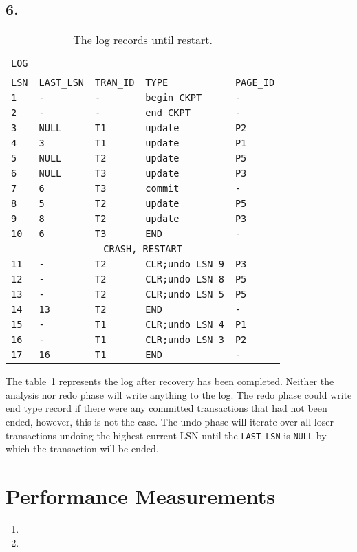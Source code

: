 \documentclass[a4paper]{article}
\begin{document}
\subsection*{6.}
\begin{table}[h!]
\begin{tabular*}{\textwidth}{@{\extracolsep{\fill}}lllll}
\texttt{LOG}&&&& \\
&&&&\\
\texttt{LSN} & \texttt{LAST\_LSN} & \texttt{TRAN\_ID} & \texttt{TYPE} & \texttt{PAGE\_ID} \\
\texttt{1} & \texttt{-} & \texttt{-} & \texttt{begin CKPT} & \texttt{-} \\
\texttt{2} & \texttt{-} & \texttt{-} & \texttt{end CKPT} & \texttt{-} \\
\texttt{3} & \texttt{NULL} & \texttt{T1} & \texttt{update} & \texttt{P2} \\
\texttt{4} & \texttt{3} &\texttt{T1} & \texttt{update} & \texttt{P1} \\
\texttt{5} & \texttt{NULL} & \texttt{T2} & \texttt{update} & \texttt{P5} \\
\texttt{6} & \texttt{NULL} & \texttt{T3} & \texttt{update} & \texttt{P3} \\
\texttt{7} & \texttt{6} & \texttt{T3} & \texttt{commit} & \texttt{-} \\
\texttt{8} & \texttt{5} & \texttt{T2} & \texttt{update} & \texttt{P5} \\
\texttt{9} & \texttt{8} & \texttt{T2} & \texttt{update} & \texttt{P3} \\
\texttt{10} & \texttt{6} & \texttt{T3} & \texttt{END} & \texttt{-} \\
\multicolumn{5}{c}{\texttt{CRASH, RESTART}}\\
\texttt{11} & \texttt{-} & \texttt{T2} & \texttt{CLR;undo LSN 9} & \texttt{P3} \\
\texttt{12} & \texttt{-} & \texttt{T2} & \texttt{CLR;undo LSN 8} & \texttt{P5} \\
\texttt{13} & \texttt{-} & \texttt{T2} & \texttt{CLR;undo LSN 5} & \texttt{P5} \\
\texttt{14} & \texttt{13} &\texttt{T2} & \texttt{END} & \texttt{-} \\
\texttt{15} & \texttt{-} & \texttt{T1} & \texttt{CLR;undo LSN 4} & \texttt{P1} \\
\texttt{16} & \texttt{-} & \texttt{T1} & \texttt{CLR;undo LSN 3} & \texttt{P2} \\
\texttt{17} & \texttt{16} & \texttt{T1} & \texttt{END} & \texttt{-} \\
\end{tabular*}
\caption{The log records until restart.}
\label{crs}
\end{table}
The table~\ref{crs} represents the log after recovery has been completed. Neither the analysis nor redo phase will write anything to the log. The redo phase could write end type record if there were any committed transactions that had not been ended, however, this is not the case. The undo phase will iterate over all loser transactions undoing the highest current LSN until the \texttt{LAST\_LSN} is \texttt{NULL} by which the transaction will be ended.
\section{Performance Measurements}
\begin{enumerate}
\item
\item
\end{enumerate}
\end{document}
